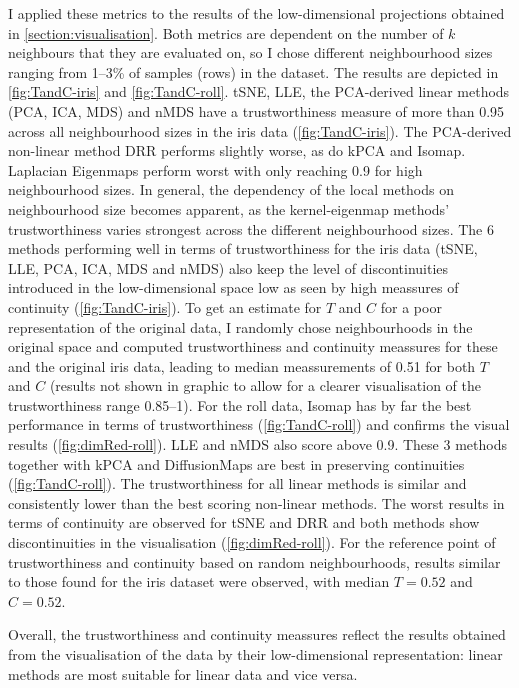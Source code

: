 I applied these metrics to the results of the low-dimensional projections obtained in \cref{section:visualisation}. Both metrics are dependent on the number of \(k\) neighbours that they are evaluated on, so I chose different neighbourhood sizes ranging from \numrange{1}{3}\% of samples (rows) in the dataset. The results are depicted in \cref{fig:TandC-iris} and \cref{fig:TandC-roll}. tSNE, LLE, the PCA-derived linear methods (PCA, ICA, MDS) and nMDS have a trustworthiness measure of more than \num{0.95} across all neighbourhood sizes in the iris data (\cref{fig:TandC-iris}). The PCA-derived non-linear method DRR performs slightly worse, as do kPCA and Isomap. Laplacian Eigenmaps perform worst with only reaching \num{0.9} for high neighbourhood sizes. In general, the dependency of the local methods on neighbourhood size becomes apparent, as the kernel-eigenmap methods' trustworthiness varies strongest across the different neighbourhood sizes. The \num{6} methods performing well in terms of trustworthiness for the iris data (tSNE, LLE, PCA, ICA, MDS and nMDS) also keep the level of discontinuities introduced in the low-dimensional space low as seen by high meassures of continuity (\cref{fig:TandC-iris}). To get an estimate for \(T\) and \(C\) for a poor representation of the original data, I randomly chose neighbourhoods in the original space and computed trustworthiness and continuity meassures for these and the original iris data, leading to median meassurements of \num{0.51} for both \(T\) and \(C\) (results not shown in graphic to allow for a clearer visualisation of the trustworthiness range \numrange{0.85}{1}).  For the roll data, Isomap has by far the best performance in terms of trustworthiness (\cref{fig:TandC-roll}) and confirms the visual results (\cref{fig:dimRed-roll}). LLE and nMDS also score above \num{0.9}. These \num{3} methods together with kPCA and DiffusionMaps are best in preserving continuities (\cref{fig:TandC-roll}). The trustworthiness for all linear methods is similar and consistently lower than the best scoring non-linear methods. The worst results in terms of continuity are observed for tSNE and DRR and both methods show discontinuities in the visualisation (\cref{fig:dimRed-roll}).  For the reference point of trustworthiness and continuity based on random neighbourhoods, results similar to those found for the iris dataset were observed, with median \(T=0.52\) and \(C=0.52\).

Overall, the trustworthiness and continuity meassures reflect the results obtained from the visualisation of the data by their low-dimensional representation: linear methods are most suitable for linear data and vice versa. 

